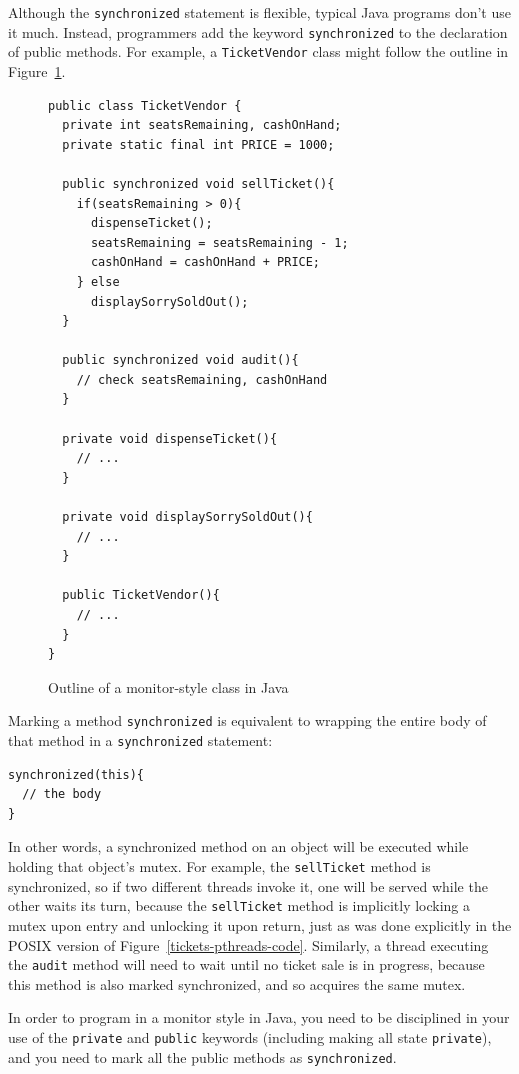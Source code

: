 Although the \verb|synchronized|
statement is flexible, typical Java programs don't use it much.  Instead, programmers add the keyword
\verb|synchronized| to the declaration of public methods.  For
example, a \verb|TicketVendor| class might follow the outline in
Figure~\ref{TicketVendor}.
\begin{figure}
\begin{verbatim}
public class TicketVendor {
  private int seatsRemaining, cashOnHand;
  private static final int PRICE = 1000;

  public synchronized void sellTicket(){
    if(seatsRemaining > 0){
      dispenseTicket();
      seatsRemaining = seatsRemaining - 1;
      cashOnHand = cashOnHand + PRICE;
    } else
      displaySorrySoldOut();
  }

  public synchronized void audit(){
    // check seatsRemaining, cashOnHand
  }

  private void dispenseTicket(){
    // ...
  }

  private void displaySorrySoldOut(){
    // ...
  }

  public TicketVendor(){
    // ...
  }
}
\end{verbatim}
\caption{Outline of a monitor-style class in Java}
\label{TicketVendor}
\end{figure}
Marking a method \verb|synchronized| is
equivalent to wrapping the entire body of that method in
a \verb|synchronized| statement:
\begin{verbatim}
synchronized(this){
  // the body
}
\end{verbatim}
In other words, a synchronized method on an object will be executed
while holding that object's mutex.  For example, the \verb|sellTicket|
method is synchronized, so if two different threads invoke it, one
will be served while the other waits its turn, because the
\verb|sellTicket| method is implicitly locking a mutex upon entry and
unlocking it upon return, just as was done explicitly in the POSIX
version of Figure~\ref{tickets-pthreads-code}.  Similarly, a thread
executing the \verb|audit| method will need to wait until no ticket
sale is in progress, because this method is also marked synchronized,
and so acquires the same mutex.

In order to program in a monitor style in Java, you need to be
disciplined in your use of the \verb|private| and \verb|public|
keywords (including making all state \verb|private|), and you need to
mark all the public methods as \verb|synchronized|.

